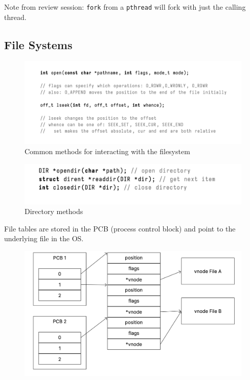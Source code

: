 \documentclass[../notes.tex]{subfiles}
\begin{document}
\begin{blockquote}
    Note from review session: \texttt{fork} from a \texttt{pthread} will fork with just the calling thread.
\end{blockquote}









\subsection{File Systems}


\begin{figure}[H]
    \centering
    \includegraphics[width=0.8\linewidth]{img/image_2023-03-15-18-18-36.png}
    \caption{Common methods for interacting with the filesystem}
\end{figure}

\begin{figure}[H]
    \centering
    \includegraphics[width=0.8\linewidth]{img/image_2023-03-15-18-18-54.png}
    \caption{Directory methods}
\end{figure}

File tables are stored in the PCB (process control block) and point to the underlying file in the OS.

\begin{figure}[H]
    \centering
    \includegraphics[width=0.8\linewidth]{img/image_2023-03-15-18-19-46.png}
\end{figure}
\end{document}
